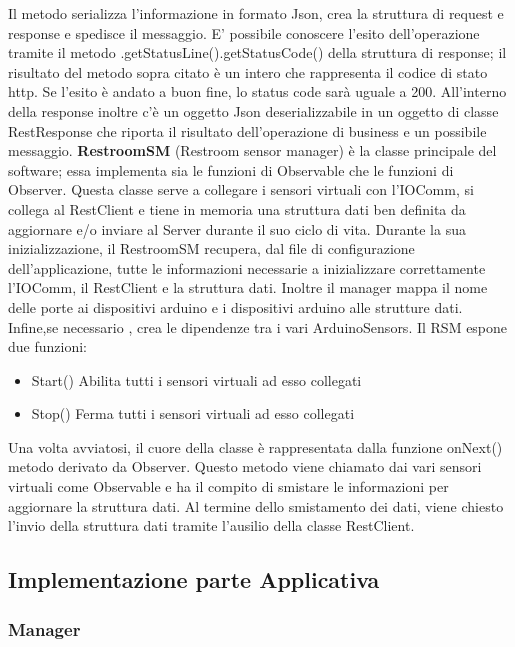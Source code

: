 \documentclass[12pt]{article}
\begin{document}
Il metodo serializza l'informazione in formato Json, crea la struttura di request e response e spedisce il messaggio. E' possibile conoscere l'esito dell'operazione tramite il metodo .getStatusLine().getStatusCode() della struttura di response; il risultato del metodo sopra citato è un intero che rappresenta il codice di stato http. Se l'esito è andato a buon fine, lo status code sarà uguale a 200. All'interno della response inoltre c'è un oggetto Json deserializzabile in un oggetto di classe RestResponse che riporta il risultato dell'operazione di business e un possibile messaggio.
\textbf{RestroomSM} (Restroom sensor manager) è la classe principale del software; essa implementa sia le funzioni di Observable che le funzioni di Observer. Questa classe serve a collegare i sensori virtuali con l'IOComm, si collega al RestClient e tiene in memoria una struttura dati ben definita da aggiornare e/o inviare al Server durante il suo ciclo di vita.
Durante la sua inizializzazione, il RestroomSM recupera, dal file di configurazione dell'applicazione, tutte le informazioni necessarie a inizializzare correttamente l'IOComm, il RestClient e la struttura dati. Inoltre il manager mappa il nome delle porte ai dispositivi arduino e i dispositivi arduino alle strutture dati. Infine,se necessario , crea le dipendenze tra i vari ArduinoSensors.
Il RSM espone due funzioni:
\begin{itemize}
\item Start() Abilita tutti i sensori virtuali ad esso collegati
\item Stop() Ferma tutti i sensori virtuali ad esso collegati
\end{itemize}
Una volta avviatosi, il cuore della classe è rappresentata dalla funzione onNext() metodo derivato da Observer.
Questo metodo viene chiamato dai vari sensori virtuali come Observable e ha il compito di smistare le informazioni per aggiornare la struttura dati. Al termine dello smistamento dei dati, viene chiesto l'invio della struttura dati tramite l'ausilio della classe RestClient.
\newpage
\subsection{Implementazione parte Applicativa}
\subsubsection{Manager}
\end{document}
